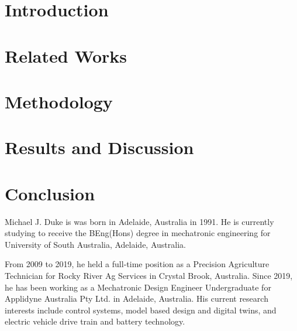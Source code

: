 \documentclass{ieeeaccess}
\begin{document}
\titlepgskip=-15pt

\maketitle

\section{Introduction}
\label{sec:introduction}
	

\section{Related Works}
\label{sec:rel}
	

\section{Methodology}
\label{sec:meth}
	

\section{Results and Discussion}
\label{sec:res}
\FloatBarrier
	
\FloatBarrier
\section{Conclusion}
\label{sec:con}
	

	
	
	
\begin{IEEEbiography}{Michael J. Duke} is was born in Adelaide, Australia in 1991. He is currently studying to receive the BEng(Hons) degree in mechatronic engineering for University of South Australia, Adelaide, Australia.\par
From 2009 to 2019, he held a full-time position as a Precision Agriculture Technician for Rocky River Ag Services in Crystal Brook, Australia. Since 2019, he has been working as a Mechatronic Design Engineer Undergraduate for Applidyne Australia Pty Ltd. in Adelaide, Australia. His current research interests include control systems, model based design and digital twins, and electric vehicle drive train and battery technology.
\end{IEEEbiography}

\EOD
\end{document}

